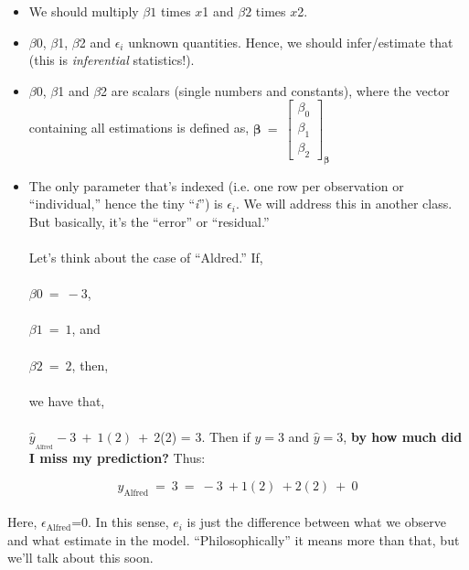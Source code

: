 \documentclass[10pt]{article}
\begin{document}
\begin{itemize}
\item We should multiply $\displaystyle \beta 1$ times $\displaystyle x$1 and $\displaystyle \beta 2$ times $\displaystyle x$2.

\item $\displaystyle \beta $0, $\displaystyle \beta $1, $\displaystyle \beta $2 and $\displaystyle \epsilon_{i}$ unknown quantities. Hence, we should infer/estimate that (this is \emph{inferential} statistics!). 

\item $\displaystyle \beta $0, $\displaystyle \beta $1 and $\displaystyle \beta $2 are scalars (single numbers and constants), where the vector containing all estimations is defined as, $\boldsymbol{\beta} \ =\ \begin{bmatrix} \beta_{0}\\\beta_{1}\\\beta_{2}\end{bmatrix}_{\boldsymbol{\beta}}$

\item The only parameter that's indexed (i.e. one row per observation or ``individual,'' hence the tiny ``\emph{i}'') is $\displaystyle \epsilon _{i}$. We will address this in another class. But basically, it's the ``error'' or ``residual.'' 
\\
\\
Let's think about the case of ``Aldred.''  If,
\\
\\
$\beta 0\ =\ -3$, 
\\
\\
$\beta 1\ =\ 1$, and
\\
\\
$\beta 2\ =\ 2$, then,
\\
\\
we have that,
\\
\\
$\displaystyle \hat{y}_{_{\text{Alfred}}} -3\ +\ 1( 2) \ +\ $2(2) = 3. Then if $y=3$ and $\hat{y}=3$, {\bf by how much did I miss my prediction?} Thus:
\end{itemize}


\begin{equation*}
\hat{y}_{\text{Alfred}} \ =\ 3\ =\ -3\ +1( 2) \ +2( 2) \ +\ 0
\end{equation*}


\paragraph{}Here, $\displaystyle \epsilon _{\text{Alfred}}$=0. In this sense, $\displaystyle e_{i}$ is just the difference between what we observe and what estimate in the model. ``Philosophically'' it means more than that, but we'll talk about this soon.
\end{document}
